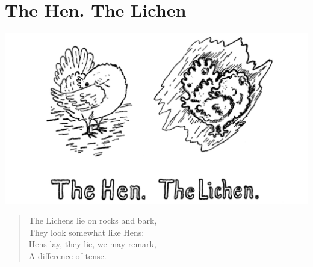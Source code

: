 \documentclass[letterpaper, 10pt, openany]{memoir}
\begin{document}
\chapter{The Hen. The Lichen}
\includegraphics[width=1\textwidth]{f-p08.png}
\vspace{\onelineskip}
\begin{verse}\huge
The Lichens lie on rocks and bark,\\
They look somewhat like Hens:\\
Hens \underline{lay}, they \underline{lie}, we may remark,\\
A difference of tense.\\
\end{verse}
\vspace{\onelineskip}
\end{document}
